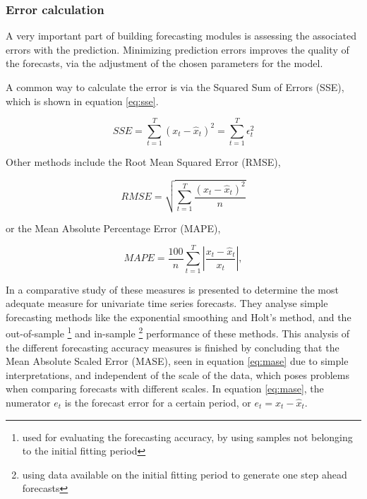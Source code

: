 \subsubsection{Error calculation}

A very important part of building forecasting modules is assessing the associated errors with the prediction. Minimizing prediction errors improves the quality of the
forecasts, via the adjustment of the chosen parameters for the model.

\par A common way to calculate the error is via the Squared Sum of Errors (SSE), which is shown in equation \ref{eq:sse}. 

\begin {equation} 
    \label{eq:sse}
    SSE = \sum_{t=1}^T{(x_t-\hat{x}_{t})^2} = \sum_{t=1}^T{\epsilon_t^2}
\end {equation}

\par Other methods include the Root Mean Squared Error (RMSE),

\begin {equation*} 
    \label{eq:mape}
     RMSE = \sqrt{\sum_{t=1}^T\frac{(x_t-\hat{x}_{t})^2}{n}} 
\end {equation*}

\par or the Mean Absolute Percentage Error (MAPE),

\begin {equation*} 
    \label{eq:mape}
    MAPE = \frac{100}{n} \sum_{t=1}^T{\left | \frac{x_t - \hat{x}_t}{x_t} \right |},
\end {equation*}

In \cite{hyndman_another_2006} a comparative study of these measures is presented to determine the most adequate measure for univariate time series forecasts. They
analyse simple forecasting methods like the exponential smoothing and Holt's method, and the out-of-sample \footnote{used for evaluating the forecasting 
accuracy, by using samples not belonging to the initial fitting period} and in-sample \footnote{using data available on the initial fitting period to generate one 
step ahead forecasts} performance of these methods. This analysis of the different forecasting accuracy measures is finished by concluding that the Mean Absolute
Scaled Error (MASE), seen in equation \ref{eq:mase} due to simple interpretations, and independent of the scale of the data, which poses problems when comparing 
forecasts with different scales. In equation \ref{eq:mase}, the numerator $e_t$ is the forecast error for a certain period, or $e_t = x_t - \hat{x}_t$.

